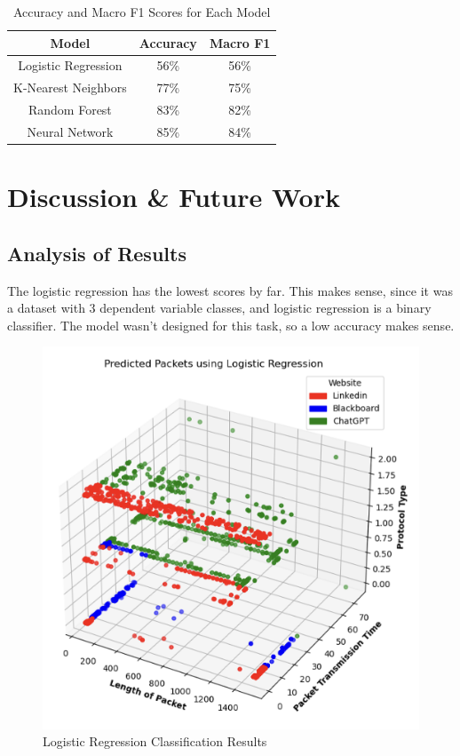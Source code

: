 \documentclass[10pt,sigconf,letterpaper,nonacm]{acmart}
\begin{document}
\begin{table}[!h]
  \begin{center}
  \caption{Accuracy and Macro F1 Scores for Each Model}
  \label{tab:results}
  \begin{tabular}{|c|c|c|}
    \hline
    Model & Accuracy & Macro F1 \\
    \hline
    Logistic Regression & 56\% & 56\% \\
    K-Nearest Neighbors & 77\% & 75\% \\
    Random Forest & 83\% & 82\% \\
    Neural Network & 85\% & 84\% \\
    \hline
  \end{tabular}
  \end{center}
\end{table}


\section{Discussion \& Future Work}
\subsection{Analysis of Results}

The logistic regression has the lowest scores by far. This makes sense, since it was a dataset with 3 dependent variable classes, and logistic regression is a binary classifier. 
The model wasn't designed for this task, so a low accuracy makes sense.



\begin{figure}
    \centering
    \includegraphics[width=1\linewidth]{Figures_and_Graphs/logRegFig.png}
    \caption{Logistic Regression Classification Results}
    \label{fig:log_reg_scatter}
\end{figure}
\end{document}
